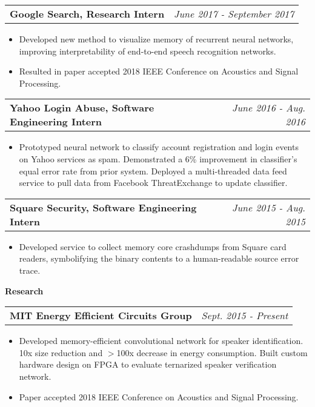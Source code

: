 \documentclass[letterpaper,11pt]{article}
\makeatletter
\newcommand{\resitem}[1]{\item[--] #1 \vspace{-4pt}}
\newcommand{\ressubheadingtwo}[2] {
\begin{tabular*}{7in}{l@{\extracolsep{\fill}}r}
	\textbf{#1} & \textit{#2} \\
\end{tabular*}\vspace{-6pt}}
\makeatother
\begin{document}
	\ressubheadingtwo{Google Search, Research Intern}{June 2017 - September 2017}
	\begin{itemize}
            \resitem{Developed new method to visualize memory of recurrent neural networks, improving interpretability of end-to-end speech recognition networks.}
            \resitem{Resulted in paper accepted 2018 IEEE Conference on Acoustics and Signal Processing. }
	\end{itemize}

	\ressubheadingtwo{Yahoo Login Abuse, Software Engineering Intern}{June 2016 - Aug. 2016}
	\begin{itemize}
            \resitem{Prototyped neural network to classify account registration and login events on Yahoo services as spam. Demonstrated a 6\% improvement in classifier's equal error rate from prior system. Deployed a multi-threaded data feed service to pull data from Facebook ThreatExchange to update classifier.}
	\end{itemize}

    \vspace{0.05in}

    \vspace{0.05in}
	\ressubheadingtwo{Square Security, Software Engineering Intern}{June 2015 - Aug. 2015}
	\begin{itemize}
            \resitem{Developed service to collect memory core crashdumps from Square card readers, symbolifying the binary contents to a human-readable source error trace.}
	\end{itemize}

    \vspace{0.05in}

\large \textbf{Research \vspace{1mm}} \normalsize
    \vspace{0.05in}

	\ressubheadingtwo{MIT Energy Efficient Circuits Group}{Sept. 2015 - Present}{}
	\begin{itemize}
            \resitem{Developed memory-efficient convolutional network for speaker identification. 10x size reduction and $>$100x decrease in energy consumption. Built custom hardware design on FPGA to evaluate ternarized speaker verification network.}
            \resitem{Paper accepted 2018 IEEE Conference on Acoustics and Signal Processing. }
	\end{itemize}
\end{document}
